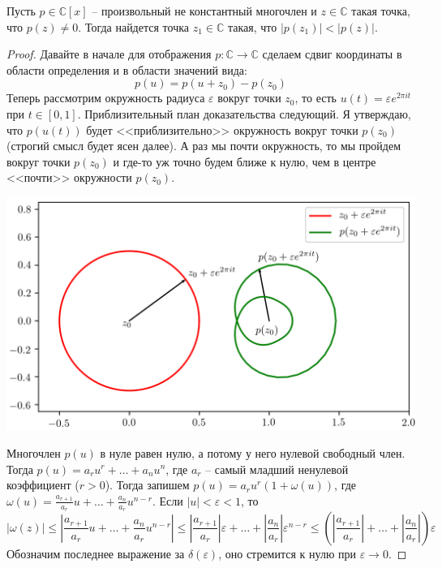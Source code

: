 \begin{claim}
Пусть $p\in\mathbb C[x]$ -- произвольный не константный многочлен и $z\in \mathbb C$ такая точка, что $p(z)\neq 0$.
Тогда найдется точка $z_1\in \mathbb C$ такая, что $|p(z_1)|<|p(z)|$.
\end{claim}
\begin{proof}

Давайте в начале для отображения $p\colon \mathbb C\to \mathbb C$ сделаем сдвиг координаты в области определения и в области значений вида:
\[
p(u) = p(u + z_0) - p(z_0)
\]
Теперь рассмотрим окружность радиуса $\varepsilon$ вокруг точки $z_0$, то есть $u(t) = \varepsilon e^{2\pi i t}$ при $t\in [0,1]$.
Приблизительный план доказательства следующий.
Я утверждаю, что $p(u(t))$ будет <<приблизительно>> окружность вокруг точки $p(z_0)$ (строгий смысл будет ясен далее).
А раз мы почти окружность, то мы пройдем вокруг точки $p(z_0)$ и где-то уж точно будем ближе к нулю, чем в центре <<почти>> окружности $p(z_0)$.
\begin{center}
\includegraphics[scale = 0.5]{Figures/graph_cyrcle_cut.png}
\end{center}
Многочлен $p(u)$ в нуле равен нулю, а потому у него нулевой свободный член.
Тогда $p(u) = a_r u^r + \ldots + a_n u^n$, где $a_r$ -- самый младший ненулевой коэффициент ($r > 0$).
Тогда запишем $p(u) = a_r u^r (1 + \omega(u))$, где $\omega(u) = \frac{a_{r+1}}{a_r}u + \ldots + \frac{a_n}{a_r} u^{n-r}$.
Если $|u| < \varepsilon < 1$, то 
\[
|\omega(z)| \leqslant \left| \frac{a_{r+1}}{a_r}u+ \ldots + \frac{a_n}{a_r} u^{n-r}\right| \leqslant  \left|\frac{a_{r+1}}{a_r}\right| \varepsilon+ \ldots + \left|\frac{a_n}{a_r}\right| \varepsilon^{n-r} \leqslant  \left(\left|\frac{a_{r+1}}{a_r}\right|+ \ldots + \left|\frac{a_n}{a_r}\right| \right)\varepsilon
\]
Обозначим последнее выражение за $\delta(\varepsilon)$, оно стремится к нулю при $\varepsilon \to 0$.

\end{proof}
